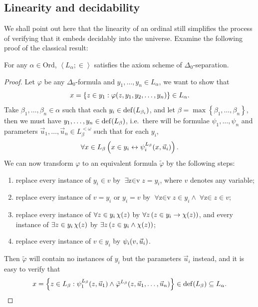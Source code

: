 \documentclass[12pt,openany]{book}
\theoremstyle{plain}
\theoremstyle{definition}
\newcommand\uplabel[1]{\textup{(#1)}}
\newcommand\tuple[1]{\left\langle #1 \right\rangle}
\newcommand\opA[1]{\mathop{\forall #1}}
\newcommand\opE[1]{\mathop{\exists #1}}
\DeclareMathOperator\dd{def}
\newcommand\KP{\mathrm{KP}}
\newcommand\ZF{\mathrm{ZF}}
\newcommand\Ord{\mathrm{Ord}}
\begin{document}
\subsection*{Linearity and decidability}

We shall point out here that the linearity of an ordinal still simplifies the process of verifying that it embeds decidably into the universe. Examine the following proof of the classical result:
\begin{lemma}[$\ZF$ or $\KP$]
  \label{lem:zf-l-delta-0-separation}
  For any $\alpha \in \Ord$, $\tuple{L_\alpha; \in}$ satisfies the axiom scheme of $\Delta_0$-separation.
\end{lemma}

\begin{proof}
  Let $\varphi$ be any $\Delta_0$-formula and $y_1, \ldots, y_n \in L_\alpha$, we want to show that
  \[x = \left\{z \in y_1 : \varphi\mleft(z, y_1, y_2, \ldots, y_n\mright)\right\} \in L_\alpha.\]
  Take $\beta_1, \ldots, \beta_n \in \alpha$ such that each $y_i \in \dd\mleft(L_{\beta_i}\mright)$, and let $\beta = \max \left\{\beta_1, \ldots, \beta_n\right\}$, then we must have $y_1, \ldots, y_n \in \dd\mleft(L_\beta\mright)$, i.e.\ there will be formulae $\psi_1, \ldots, \psi_n$ and parameters $\vec{u}_1, \ldots, \vec{u}_n \in L_\beta^{< \omega}$ such that for each $y_i$,
  \[\opA{x \in L_\beta} \left(x \in y_i \leftrightarrow \psi_i^{L_\beta}\mleft(x, \vec{u}_i\mright)\right).\]
  We can now transform $\varphi$ to an equivalent formula $\tilde{\varphi}$ by the following steps:
  \begin{enumerate}[label=\uplabel{\arabic*}]
    \item replace every instance of $y_i \in v$ by $\opE{z \in v} z = y_i$, where $v$ denotes any variable;
    \item replace every instance of $v = y_i$ or $y_i = v$ by $\opA{z \in v} z \in y_i \land \opA{z \in y_i} z \in v$;
    \item replace every instance of $\opA{z \in y_i} \chi\mleft(z\mright)$ by $\opA{z} \left(z \in y_i \rightarrow \chi\mleft(z\mright)\right)$, and every instance of $\opE{z \in y_i} \chi\mleft(z\mright)$ by $\opE{z} \left(z \in y_i \land \chi\mleft(z\mright)\right)$;
    \item replace every instance of $v \in y_i$ by $\psi_i\mleft(v, \vec{u}_i\mright)$.
  \end{enumerate}
  Then $\tilde{\varphi}$ will contain no instances of $y_i$ but the parameters $\vec{u}_i$ instead, and it is easy to verify that
  \[x = \left\{z \in L_\beta : \psi_1^{L_\beta}\mleft(z, \vec{u}_1\mright) \land \tilde{\varphi}^{L_\beta}\mleft(z, \vec{u}_1, \ldots, \vec{u}_n\mright)\right\} \in \dd\mleft(L_\beta\mright) \subseteq L_\alpha. \qedhere\]
\end{proof}
\end{document}

